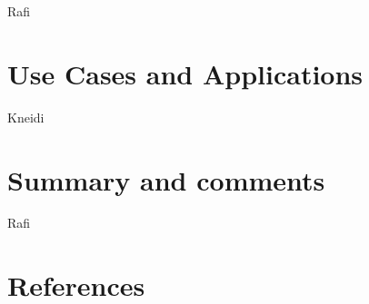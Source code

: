 \documentclass[english,notitlepage,smartquotes]{hgbreport}
\begin{document}
Rafi


\section{Use Cases and Applications}

Kneidi


\section*{Summary and comments}

Rafi


  
\section*{References}

\printbibliography[heading=noheader]

\end{document}
